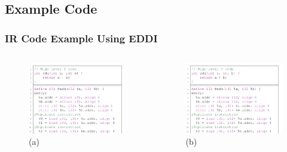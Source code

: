 \documentclass[
	12pt, %
]{beamer}
\begin{document}
\subsection{Example Code}
\begin{frame}
	\frametitle{IR Code Example Using EDDI}
	
	
	\begin{columns}[c]
		\begin{column}{0.5\textwidth} %
			\begin{figure}
				\includegraphics[width=1\linewidth]{img2.png}
				\caption{(a)}
				\label{IR code examples of using EDDI(a)}
			\end{figure}
		\end{column}
		\begin{column}{0.5\textwidth} %
			\begin{figure}
				\includegraphics[width=1\linewidth]{img2.png}
				\caption{(b)}
				\label{IR code examples of using EDDs(b)}
			\end{figure}
		\end{column}
		\end{columns}
\end{frame}
\end{document}
